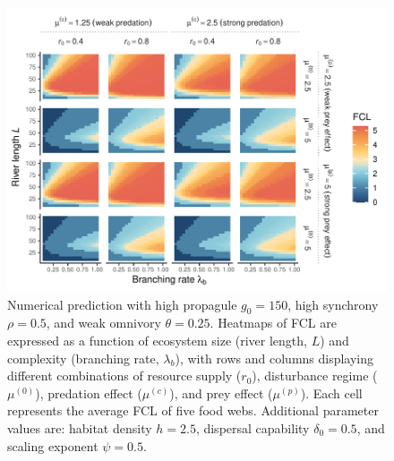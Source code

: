 \begin{figure}
\centering
\includegraphics{../data_fmt/fig_rho05_g150_theta025.pdf}
\caption{\label{fig:fig-num4}Numerical prediction with high propagule
\(g_0 = 150\), high synchrony \(\rho = 0.5\), and weak omnivory
\(\theta = 0.25\). Heatmaps of FCL are expressed as a function of
ecosystem size (river length, \(L\)) and complexity (branching rate,
\(\lambda_b\)), with rows and columns displaying different combinations
of resource supply (\(r_0\)), disturbance regime (\(\mu^{(0)}\)),
predation effect (\(\mu^{(c)}\)), and prey effect (\(\mu^{(p)}\)). Each
cell represents the average FCL of five food webs. Additional parameter
values are: habitat density \(h=2.5\), dispersal capability
\(\delta_0=0.5\), and scaling exponent \(\psi=0.5\).}
\end{figure}

\newpage

